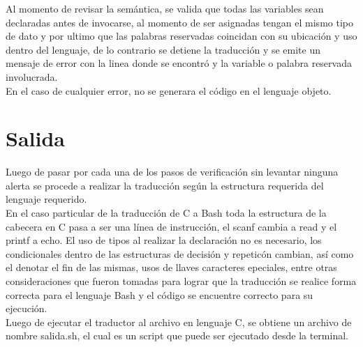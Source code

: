 \documentclass[aspectratio=169]{article}
\begin{document}
	Al momento de revisar la semántica, se valida que todas las variables sean declaradas antes de invocarse, al momento de ser asignadas tengan el mismo tipo de dato y por ultimo que las palabras reservadas coincidan con su ubicación y uso dentro del lenguaje, de lo contrario se detiene la traducción y se emite un mensaje de error con la linea donde se encontró y la variable o palabra reservada involucrada.\\

	En el caso de cualquier error, no se generara el código en el lenguaje objeto.

\section{Salida}

	Luego de pasar por cada una de los pasos de verificación sin levantar ninguna alerta se procede a realizar la traducción según la estructura requerida del lenguaje requerido.\\

	En el caso particular de la traducci\'on de C a Bash toda la estructura de la cabecera en C pasa a ser una línea de instrucci\'on, el scanf  cambia a read y el printf a echo. El uso de tipos al realizar la declaraci\'on no es necesario, los condicionales dentro de las estructuras de decisi\'on y repetic\'on cambian, así como el denotar el fin de las mismas, usos de llaves caracteres epeciales, entre otras consideraciones que fueron tomadas para lograr que la traducci\'on se realice forma correcta para el lenguaje Bash y el c\'odigo se encuentre correcto para su ejecuci\'on.\\

	Luego de ejecutar el traductor al archivo en lenguaje C, se obtiene un archivo de nombre salida.sh, el cual es un script que puede ser ejecutado desde la terminal.
\end{document}
